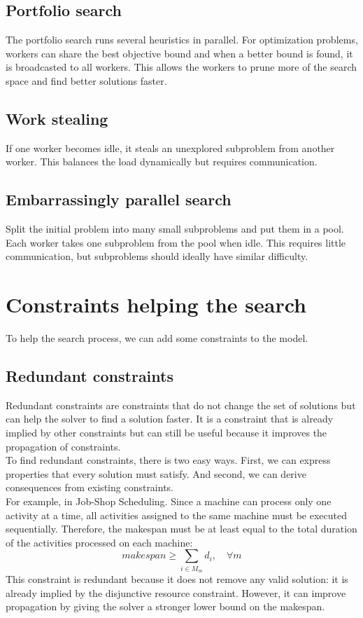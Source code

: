 \documentclass[12pt, openany]{report}
\theoremstyle{definition}
\begin{document}
\subsection{Portfolio search}
The portfolio search runs several heuristics in parallel. For optimization problems, workers can share the best objective bound and when a better bound is found, it is broadcasted to all workers. This allows the workers to prune more of the search space and find better solutions faster.
\subsection{Work stealing}
If one worker becomes idle, it steals an unexplored subproblem from another worker. This balances the load dynamically but requires communication.
\subsection{Embarrassingly parallel search}
Split the initial problem into many small subproblems and put them in a pool. Each worker takes one subproblem from the pool when idle. This requires little communication, but subproblems should ideally have similar difficulty.
\section{Constraints helping the search}
To help the search process, we can add some constraints to the model.
\subsection{Redundant constraints}
Redundant constraints are constraints that do not change the set of solutions but can help the solver to find a solution faster. It is a constraint that is already implied by other constraints but can still be useful because it improves the propagation of constraints.\\
To find redundant constraints, there is two easy ways. First, we can express properties that every solution must satisfy. And second, we can derive consequences from existing constraints.\\ 
For example, in Job-Shop Scheduling. Since a machine can process only one activity at a time, all activities assigned to the same machine must be executed sequentially. Therefore, the makespan must be at least equal to the total duration of the activities processed on each machine:
\begin{equation}
    makespan \geq \sum_{i \in M_m} d_i, \quad \forall m
\end{equation}
This constraint is redundant because it does not remove any valid solution: it is already implied by the disjunctive resource constraint. However, it can improve propagation by giving the solver a stronger lower bound on the makespan.
\end{document}
